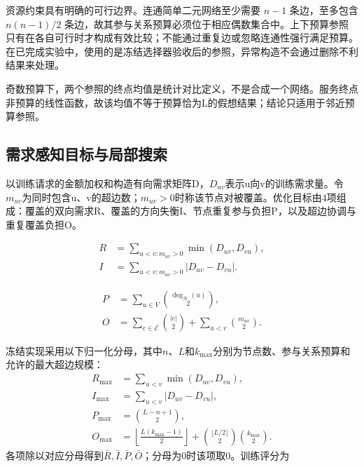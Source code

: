 \documentclass[UTF8,a4paper,twocolumn,fontset=none,zihao=5]{ctexart}
\begin{document}
资源约束具有明确的可行边界。连通简单二元网络至少需要 $n-1$ 条边，至多包含 $n(n-1)/2$ 条边，故其参与关系预算必须位于相应偶数集合中。上下预算参照只有在各自可行时才构成有效比较；不能通过重复边或忽略连通性强行满足预算。在已完成实验中，使用的是冻结选择器验收后的参照，异常构造不会通过删除不利结果来处理。


奇数预算下，两个参照的终点均值是统计对比定义，不是合成一个网络。服务终点非预算的线性函数，故该均值不等于预算恰为L的假想结果；结论只适用于邻近预算参照。


\subsection{需求感知目标与局部搜索}

以训练请求的金额加权和构造有向需求矩阵D，$D_{uv}$表示u向v的训练需求量。令$m_{uv}$为同时包含u、v的超边数；$m_{uv}>0$时称该节点对被覆盖。优化目标由4项组成：覆盖的双向需求R、覆盖的方向失衡I、节点重复参与负担P，以及超边协调与重复覆盖负担O。



\begin{equation}
\begin{aligned}R&=\sum_{u<v:m_{uv}>0}\min(D_{uv},D_{vu}),\\I&=\sum_{u<v:m_{uv}>0}|D_{uv}-D_{vu}|.\end{aligned}
\label{eq:9}\end{equation}



\begin{equation}
\begin{aligned}P&=\sum_{u\in V}\binom{\deg_{\mathcal H}(u)}{2},\\O&=\sum_{e\in\mathcal E}\binom{|e|}{2}+\sum_{u<v}\binom{m_{uv}}{2}.\end{aligned}
\label{eq:10}\end{equation}


冻结实现采用以下归一化分母，其中$n$、$L$和$k_{\max}$分别为节点数、参与关系预算和允许的最大超边规模：
\[
\begin{aligned}
R_{\max}&=\sum_{u<v}\min(D_{uv},D_{vu}),\\
I_{\max}&=\sum_{u<v}|D_{uv}-D_{vu}|,\\
P_{\max}&=\binom{L-n+1}{2},\\
O_{\max}&=\left\lfloor\frac{L(k_{\max}-1)}{2}\right\rfloor
+\binom{\lfloor L/2\rfloor}{2}\binom{k_{\max}}{2}.
\end{aligned}
\]
各项除以对应分母得到$\bar R,\bar I,\bar P,\bar O$；分母为0时该项取0。训练评分为
\end{document}
